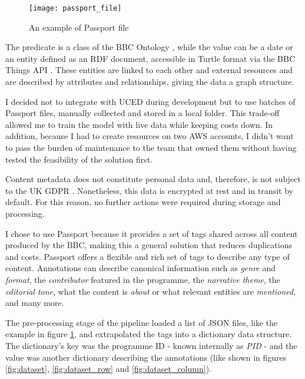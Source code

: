 \begin{figure}[h]
  \centering
  \texttt{[image: passport\_file]}
  \caption{An example of Passport file}
  \label{fig:passport_file}
\end{figure}

The predicate is a class of the BBC Ontology \cite{BBC:Ontologies},
while the value can be a date or an entity defined as an RDF \cite{W3C:RDF,W3C:RDF:Concepts} document,
accessible in Turtle format \cite{W3C:Turtle} via the BBC Things API \cite{BBC:Things,BBC:Things:About,BBC:Things:API}.
These entities are linked to each other and external resources and are described by attributes and relationships,
giving the data a graph structure.


I decided not to integrate with UCED during development but to use batches of Passport files,
manually collected and stored in a local folder.
This trade-off allowed me to train the model with live data while keeping costs down.
In addition, because I had to create resources on two AWS accounts,
I didn't want to pass the burden of maintenance to the team that owned them without having tested the feasibility of the solution first.


Content metadata does not constitute personal data and, therefore, is not subject to the UK GDPR  \cite{UKGDPR}.
Nonetheless, this data is encrypted at rest and in transit by default.
For this reason, no further actions were required during storage and processing.


I chose to use Passport because it provides a set of tags shared across all content produced by the BBC,
making this a general solution that reduces duplications and costs.
Passport offers a flexible and rich set of tags to describe any type of content.
Annotations can describe canonical information such as \textit{genre} and \textit{format},
the \textit{contributor} featured in the programme, the \textit{narrative theme}, the \textit{editorial tone},
what the content is \textit{about} or what relevant entities are \textit{mentioned}, and many more.


The pre-processing stage of the pipeline loaded a list of JSON files, like the example in figure \ref{fig:passport_file}, and extrapolated the tags into a dictionary data structure.
The dictionary's key was the programme ID - known internally as \textit{PID} - and the value was another dictionary describing the annotations
(like shown in figures \ref{fig:dataset}, \ref{fig:dataset_row} and \ref{fig:dataset_column}).

